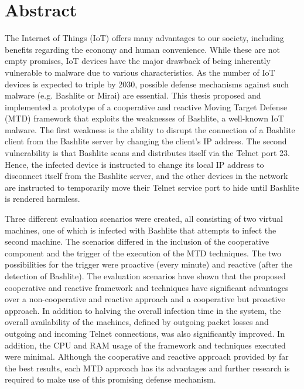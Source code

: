\chapter*{Abstract}


The Internet of Things (IoT) offers many advantages to our society, including benefits regarding the economy and human convenience. While these are not empty promises, IoT devices have the major drawback of being inherently vulnerable to malware due to various characteristics. As the number of IoT devices is expected to triple by 2030, possible defense mechanisms against such malware (e.g. Bashlite or Mirai) are essential. This thesis proposed and implemented a prototype of a cooperative and reactive Moving Target Defense (MTD) framework that exploits the weaknesses of Bashlite, a well-known IoT malware. The first weakness is the ability to disrupt the connection of a Bashlite client from the Bashlite server by changing the client's IP address. The second vulnerability is that Bashlite scans and distributes itself via the Telnet port 23. Hence, the infected device is instructed to change its local IP address to disconnect itself from the Bashlite server, and the other devices in the network are instructed to temporarily move their Telnet service port to hide until Bashlite is rendered harmless. 

Three different evaluation scenarios were created, all consisting of two virtual machines, one of which is infected with Bashlite that attempts to infect the second machine. The scenarios differed in the inclusion of the cooperative component and the trigger of the execution of the MTD techniques. The two possibilities for the trigger were proactive (every minute) and reactive (after the detection of Bashlite). The evaluation scenarios have shown that the proposed cooperative and reactive framework and techniques have significant advantages over a non-cooperative and reactive approach and a cooperative but proactive approach. In addition to halving the overall infection time in the system, the overall availability of the machines, defined by outgoing packet losses and outgoing and incoming Telnet connections, was also significantly improved. In addition, the CPU and RAM usage of the framework and techniques executed were minimal. Although the cooperative and reactive approach provided by far the best results, each MTD approach has its advantages and further research is required to make use of this promising defense mechanism.

